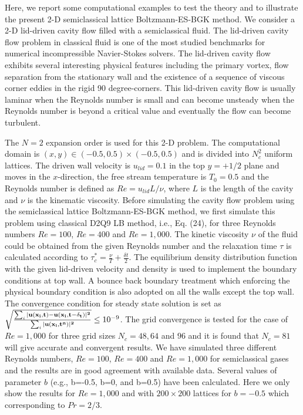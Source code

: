 \documentclass[doublecol]{epl2}
\begin{document}
Here, we report some computational examples to test the theory and to illustrate the present 2-D semiclassical lattice Boltzmann-ES-BGK method. We consider a 2-D lid-driven cavity flow filled with a semiclassical fluid. The lid-driven cavity flow problem in classical fluid is one of the most studied benchmarks for numerical incompressible Navier-Stokes solvers.  The lid-driven cavity flow exhibits several interesting physical features including the primary vortex, flow separation from the stationary wall and the existence of a sequence of viscous corner eddies in the rigid 90 degree-corners. This lid-driven cavity flow is usually laminar when the Reynolds number is small and can become unsteady when the Reynolds number is beyond a critical value and eventually the flow can become turbulent.

The $N=2$ expansion order is used for this 2-D problem. The computational domain is $(x,y) \in  (-0.5,0.5)\times(-0.5,0.5)$ and is divided into $N_c^2$ uniform lattices.   The driven wall velocity is $u_{lid}=0.1$ in the top $y=+1/2$ plane and moves in the $x$-direction, the free stream temperature is $T_{0}=0.5$ and the Reynolds number is defined as $Re =u_{lid} L/\nu$, where $L$ is the length of the cavity and $\nu$ is the kinematic viscosity.   Before simulating the cavity flow problem using the semiclassical lattice Boltzmann-ES-BGK method, we first simulate this problem using classical D2Q9 LB method, i.e., Eq. (24), for three Reynolds numbers $Re=100$, $Re=400$ and $Re=1,000$.   The kinetic viscosity $\nu$ of the fluid could be obtained from the given Reynolds number and the relaxation time $\tau$ is calculated according to $\tau_c^* =\frac{\nu}{T}+\frac{\delta t}{2}$.  The equilibrium density distribution function with the given lid-driven velocity and density is used to implement the boundary conditions at top wall.  A bounce back boundary treatment which enforcing the physical boundary condition is also adopted on all the walls except the top wall.
The convergence condition for steady state solution is set as $ \sqrt{ \frac{ \sum_i |\bf{u} (\bf{x}_i, t)-\bf{u} (\bf{x}_i, t-\delta_t)|^2}{\sum_i |\bf{u} (\bf{x}_i, t^n)|^2 } } \leq 10^{-9}$.
The grid convergence is tested for the case of $Re=1,000$ for three grid sizes $N_c=48, 64$ and $96$ and it is found that $N_c=81$ will give accurate and convergent results.  We have simulated three different Reynolds numbers, $Re=100$, $Re=400$ and $Re=1,000$ for semiclassical gases and the results are in good agreement with available data.  Several values of parameter $b$ (e.g., b=-0.5, b=0, and b=0.5) have been calculated. Here we only show the results for $Re=1,000$ and with $200 \times 200$ lattices for $b=-0.5$ which corresponding to $Pr=2/3$.
\end{document}
